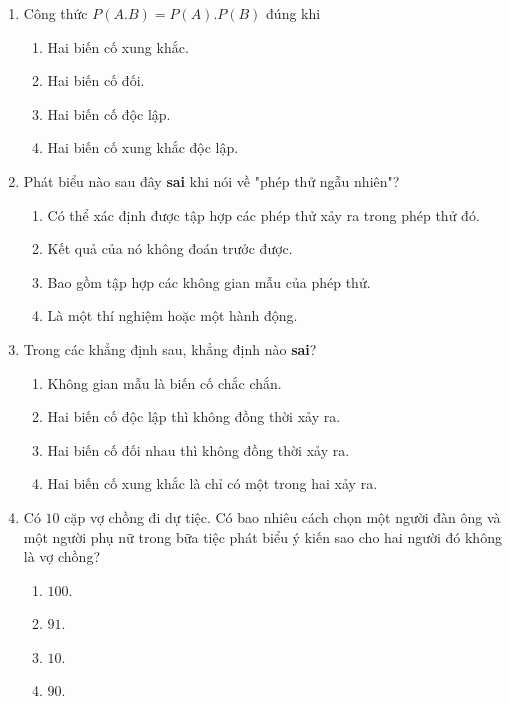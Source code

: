 \begin{enumerate}[label=\textbf{Câu \arabic*.},align=left,left=0cm..0cm,itemindent=*]
\begin{enumerate}[label=\textbf{\Alph*.},align=left,left=1cm..0cm,itemindent=*]
	\end{enumerate}
	\item Công thức $P(A.B)=P(A).P(B)$ đúng khi
	\begin{enumerate}[label=\textbf{\Alph*.},align=left,left=1cm..0cm,itemindent=*]
		\item Hai biến cố xung khắc.
		\item Hai biến cố đối.
		\item Hai biến cố độc lập.
		\item Hai biến cố xung khắc độc lập.
	\end{enumerate}
	\item Phát biểu nào sau đây \textbf{sai} khi nói về "phép thử ngẫu nhiên"?
	\begin{enumerate}[label=\textbf{\Alph*.},align=left,left=1cm..0cm,itemindent=*]
		\item Có thể xác định được tập hợp các phép thử xảy ra trong phép thử đó.
		\item Kết quả của nó không đoán trước được.
		\item Bao gồm tập hợp các không gian mẫu của phép thử.
		\item Là một thí nghiệm hoặc một hành động.
	\end{enumerate}
	\item Trong các khẳng định sau, khẳng định nào \textbf{sai}?
	\begin{enumerate}[label=\textbf{\Alph*.},align=left,left=1cm..0cm,itemindent=*]
		\item Không gian mẫu là biến cố chắc chắn.
		\item Hai biến cố độc lập thì không đồng thời xảy ra.
		\item Hai biến cố đối nhau thì không đồng thời xảy ra.
		\item Hai biến cố xung khắc là chỉ có một trong hai xảy ra.
	\end{enumerate}
	\item Có $10$ cặp vợ chồng đi dự tiệc. Có bao nhiêu cách chọn một người đàn ông và một người phụ nữ trong bữa tiệc phát biểu ý kiến sao cho hai người đó không là vợ chồng?
	\begin{multicols}{4}\begin{enumerate}[label=\textbf{\Alph*.},align=left,left=1cm..0cm,itemindent=*]
		\item $100$. \item $91$. \item $10$. \item $90$.
	\end{enumerate}\end{multicols}

\end{enumerate}
